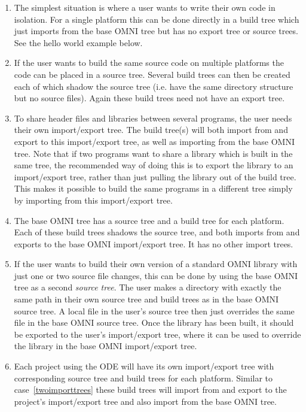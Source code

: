 \documentclass[11pt,twoside,onecolumn]{article}
\begin{document}
\begin{enumerate}

\item
\label{buildtreeonly}
The simplest situation is where a user wants to write their own code in
isolation.  For a single platform this can be done directly in a build tree
which just imports from the base OMNI tree but has no export tree or source
trees.  See the hello world example below.

\item If the user wants to build the same source code on multiple platforms the
code can be placed in a source tree.  Several build trees can then be created
each of which shadow the source tree (i.e. have the same directory structure
but no source files).  Again these build trees need not have an export tree.

\item
\label{twoimporttrees}
To share header files and libraries between several programs, the user needs
their own import/export tree.  The build tree(s) will both import from and
export to this import/export tree, as well as importing from the base OMNI
tree.  Note that if two programs want to share a library which is built in the
same tree, the recommended way of doing this is to export the library to an
import/export tree, rather than just pulling the library out of the build tree.
This makes it possible to build the same programs in a different tree simply by
importing from this import/export tree.

\item The base OMNI tree has a source tree and a build tree for each platform.
Each of these build trees shadows the source tree, and both imports from and
exports to the base OMNI import/export tree.  It has no other import trees.

\item If the user wants to build their own version of a standard OMNI library
with just one or two source file changes, this can be done by using the base
OMNI tree as a second {\em source tree}.  The user makes a directory with
exactly the same path in their own source tree and build trees as in the base
OMNI source tree.  A local file in the user's source tree then just overrides
the same file in the base OMNI source tree.  Once the library has been built,
it should be exported to the user's import/export tree, where it can be used to
override the library in the base OMNI import/export tree.

\item Each project using the ODE will have its own import/export tree with
corresponding source tree and build trees for each platform.  Similar to
case~\ref{twoimporttrees} these build trees will import from and export to the
project's import/export tree and also import from the base OMNI tree.


\end{enumerate}
\end{document}
